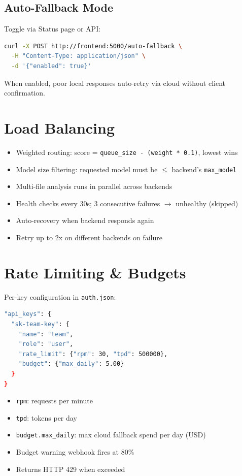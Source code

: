 \documentclass[11pt,a4paper]{article}
\begin{document}
\subsection{Auto-Fallback Mode}
Toggle via Status page or API:
\begin{lstlisting}[language=bash]
curl -X POST http://frontend:5000/auto-fallback \
  -H "Content-Type: application/json" \
  -d '{"enabled": true}'
\end{lstlisting}
When enabled, poor local responses auto-retry via cloud without client confirmation.

\section{Load Balancing}

\begin{itemize}
  \item Weighted routing: score = \texttt{queue\_size - (weight * 0.1)}, lowest wins
  \item Model size filtering: requested model must be $\leq$ backend's \texttt{max\_model}
  \item Multi-file analysis runs in parallel across backends
  \item Health checks every 30s; 3 consecutive failures $\rightarrow$ unhealthy (skipped)
  \item Auto-recovery when backend responds again
  \item Retry up to 2x on different backends on failure
\end{itemize}

\section{Rate Limiting \& Budgets}

Per-key configuration in \texttt{auth.json}:
\begin{lstlisting}[language=bash]
"api_keys": {
  "sk-team-key": {
    "name": "team",
    "role": "user",
    "rate_limit": {"rpm": 30, "tpd": 500000},
    "budget": {"max_daily": 5.00}
  }
}
\end{lstlisting}

\begin{itemize}
  \item \texttt{rpm}: requests per minute
  \item \texttt{tpd}: tokens per day
  \item \texttt{budget.max\_daily}: max cloud fallback spend per day (USD)
  \item Budget warning webhook fires at 80\%
  \item Returns HTTP 429 when exceeded
\end{itemize}
\end{document}

